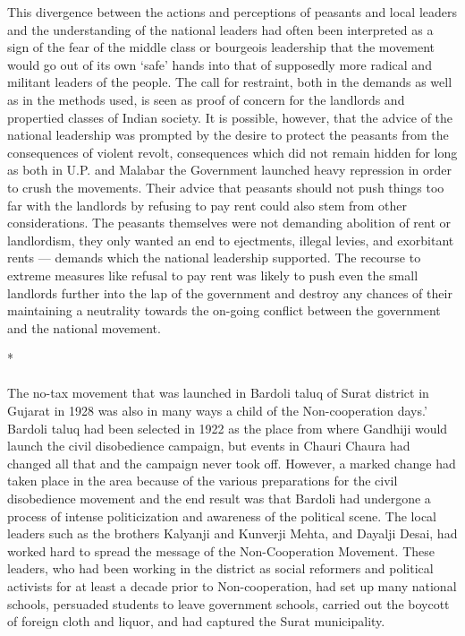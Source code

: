This divergence between the actions and perceptions of peasants and local leaders and the understanding of the national leaders had often been interpreted as a sign of the fear of the middle class or bourgeois leadership that the movement would go out of its own `safe' hands into that of supposedly more radical and militant leaders of the people. The call for restraint, both in the demands as well as in the methods used, is seen as proof of concern for the landlords and propertied classes of Indian society. It is possible, however, that the advice of the national leadership was prompted by the desire to protect the peasants from the consequences of violent revolt, consequences which did not remain hidden for long as both in U.P. and Malabar the Government launched heavy repression in order to crush the movements. Their advice that peasants should not push things too far with the landlords by refusing to pay rent could also stem from other considerations. The peasants themselves were not demanding abolition of rent or landlordism, they only wanted an end to ejectments, illegal levies, and exorbitant rents — demands which the national leadership supported. The recourse to extreme measures like refusal to pay rent was likely to push even the small landlords further into the lap of the government and destroy any chances of their maintaining a neutrality towards the on-going conflict between the government and the national movement.

\begin{center}*\end{center}

\paragraph*{}


The no-tax movement that was launched in Bardoli taluq of Surat district in Gujarat in 1928 was also in many ways a child of the Non-cooperation days.' Bardoli taluq had been selected in 1922 as the place from where Gandhiji would launch the civil disobedience campaign, but events in Chauri Chaura had changed all that and the campaign never took off. However, a marked change had taken place in the area because of the various preparations for the civil disobedience movement and the end result was that Bardoli had undergone a process of intense politicization and awareness of the political scene. The local leaders such as the brothers Kalyanji and Kunverji Mehta, and Dayalji Desai, had worked hard to spread the message of the Non-Cooperation Movement. These leaders, who had been working in the district as social reformers and political activists for at least a decade prior to Non-cooperation, had set up many national schools, persuaded students to leave government schools, carried out the boycott of foreign cloth and liquor, and had captured the Surat municipality.

